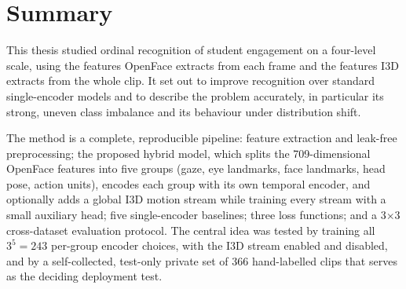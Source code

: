 \documentclass[../main.tex]{subfiles}
\begin{document}
\FloatBarrier
\section{Summary}
\label{sec:summary}

This thesis studied ordinal recognition of student engagement on a four-level scale, using the features OpenFace extracts from each frame and the features I3D extracts from the whole clip. It set out to improve recognition over standard single-encoder models and to describe the problem accurately, in particular its strong, uneven class imbalance and its behaviour under distribution shift.

The method is a complete, reproducible pipeline: feature extraction and leak-free preprocessing; the proposed hybrid model, which splits the 709-dimensional OpenFace features into five groups (gaze, eye landmarks, face landmarks, head pose, action units), encodes each group with its own temporal encoder, and optionally adds a global I3D motion stream while training every stream with a small auxiliary head; five single-encoder baselines; three loss functions; and a 3$\times$3 cross-dataset evaluation protocol. The central idea was tested by training all $3^5=243$ per-group encoder choices, with the I3D stream enabled and disabled, and by a self-collected, test-only private set of 366 hand-labelled clips that serves as the deciding deployment test.
\end{document}
